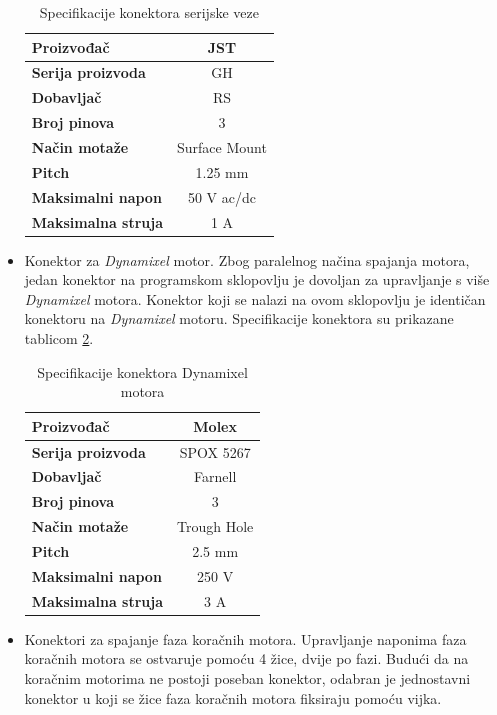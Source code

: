 \documentclass[11pt,a4paper]{article}
\begin{document}
\begin{center}
\begin{itemize}
\begin{table}[H]
	\centering
	\caption{Specifikacije konektora serijske veze}
	\label{tab:specifikacija_connector_serial}
	\begin{tabular}{|l|c|}
		\hline
		\textbf{Proizvođač} & JST \\ \hline 
		\textbf{Serija proizvoda} & GH \\ \hline 
		\textbf{Dobavljač} & RS \\ \hline 
		\textbf{Broj pinova} & 3 \\ \hline 
		\textbf{Način motaže} & Surface Mount    \\ \hline
		\textbf{Pitch} & 1.25 mm    \\ \hline 
		\textbf{Maksimalni napon} & 50 V  ac/dc\\ \hline 
		\textbf{Maksimalna struja} & 1 A \\ \hline
	\end{tabular}
\end{table}		

		
		\item Konektor za \textit{Dynamixel} motor. Zbog paralelnog načina spajanja motora, jedan konektor na programskom sklopovlju je dovoljan za upravljanje s više \textit{Dynamixel} motora. Konektor koji se nalazi na ovom sklopovlju je identičan konektoru na \textit{Dynamixel} motoru. Specifikacije konektora su prikazane tablicom \ref{tab:specifikacija_connector_dynamixel}.
		
\begin{table}[H]
	\centering
	\caption{Specifikacije konektora Dynamixel motora}
	\label{tab:specifikacija_connector_dynamixel}
	\begin{tabular}{|l|c|}
		\hline
		\textbf{Proizvođač} & Molex \\ \hline 
		\textbf{Serija proizvoda} & SPOX 5267 \\ \hline 
		\textbf{Dobavljač} & Farnell \\ \hline 
		\textbf{Broj pinova} & 3 \\ \hline 
		\textbf{Način motaže} & Trough Hole    \\ \hline
		\textbf{Pitch} & 2.5 mm    \\ \hline 
		\textbf{Maksimalni napon} & 250 V \\ \hline 
		\textbf{Maksimalna struja} & 3 A \\ \hline
	\end{tabular}
\end{table}
		
		\item Konektori za spajanje faza koračnih motora. Upravljanje naponima faza koračnih motora se ostvaruje pomoću 4 žice, dvije po fazi. Budući da na koračnim motorima ne postoji poseban konektor, odabran je jednostavni konektor u koji se žice faza koračnih motora fiksiraju pomoću vijka.
		

\end{itemize}
\end{center}
\end{document}
